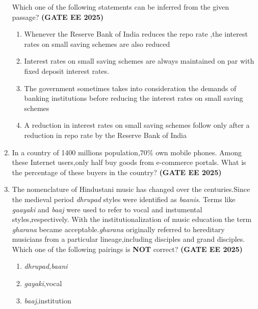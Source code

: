 \documentclass[journal,12pt,onecolumn]{IEEEtran}
\theoremstyle{remark}
\begin{document}
\begin{enumerate}
Which one of the following statements can be inferred from the given passage? \hfill \textbf{(GATE EE 2025)}
\begin{enumerate}
    \item Whenever the Reserve Bank of India reduces the repo rate ,the interest rates on small saving schemes are also reduced
    \item Interest rates on small saving schemes are always maintained on par with fixed deposit interest rates.
    \item The government sometimes takes into consideration the demands of banking institutions before reducing the interest rates on small saving schemes
    \item A reduction in interest rates on small saving schemes follow only after  a reduction in repo rate by the Reserve Bank of India
\end{enumerate}
\item In a country of 1400 millions population,$70\%$ own mobile phones. Among these Internet users,only half buy goods from e-commerce portals. What is the percentage of these buyers in the country? \hfill \textbf{(GATE EE 2025)}
\begin{enumerate}
\end{enumerate}
\item The nomenclature of Hindustani music has changed over the centuries.Since the medieval period \textit{dhrupad} styles were identified as \textit{baanis}. Terms like \textit{gaayaki} and \textit{baaj} were used to refer to vocal and instumental styles,respectively. With the institutionalization of music education the term \textit{gharana} became acceptable.\textit{gharana} originally referred to hereditary musicians from a particular lineage,including disciples and grand disciples.\\
Which one of the following pairings is \textbf{NOT} correct? \hfill \textbf{(GATE EE 2025)}
\begin{enumerate}
        \item \textit{dhrupad,baani}
        \item \textit{gayaki},vocal
        \item \textit{baaj},institution

\end{enumerate}
\end{enumerate}
\end{document}
